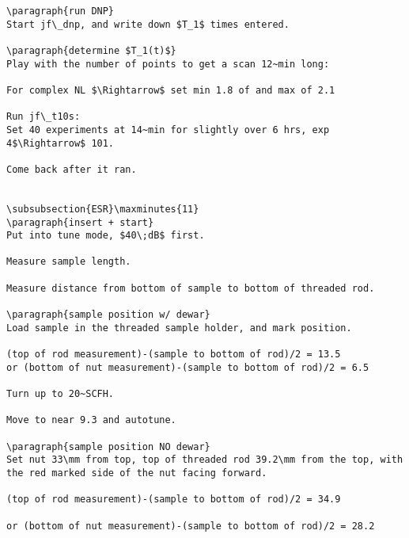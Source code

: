 \begin{scriptsize}
\begin{python}[off]
\begin{scriptsize}
\begin{lstlisting}
\paragraph{run DNP}
Start jf\_dnp, and write down $T_1$ times entered.

\paragraph{determine $T_1(t)$}
Play with the number of points to get a scan 12~min long:

For complex NL $\Rightarrow$ set min 1.8 of and max of 2.1

Run jf\_t10s:
Set 40 experiments at 14~min for slightly over 6 hrs, exp 4$\Rightarrow$ 101.

Come back after it ran.


\subsubsection{ESR}\maxminutes{11}
\paragraph{insert + start}
Put into tune mode, $40\;dB$ first.

Measure sample length.

Measure distance from bottom of sample to bottom of threaded rod.

\paragraph{sample position w/ dewar}
Load sample in the threaded sample holder, and mark position.

(top of rod measurement)-(sample to bottom of rod)/2 = 13.5
or (bottom of nut measurement)-(sample to bottom of rod)/2 = 6.5

Turn up to 20~SCFH.

Move to near 9.3 and autotune.

\paragraph{sample position NO dewar}
Set nut 33\mm from top, top of threaded rod 39.2\mm from the top, with the red marked side of the nut facing forward.

(top of rod measurement)-(sample to bottom of rod)/2 = 34.9

or (bottom of nut measurement)-(sample to bottom of rod)/2 = 28.2


\end{lstlisting}
\end{scriptsize}
\end{python}
\end{scriptsize}
